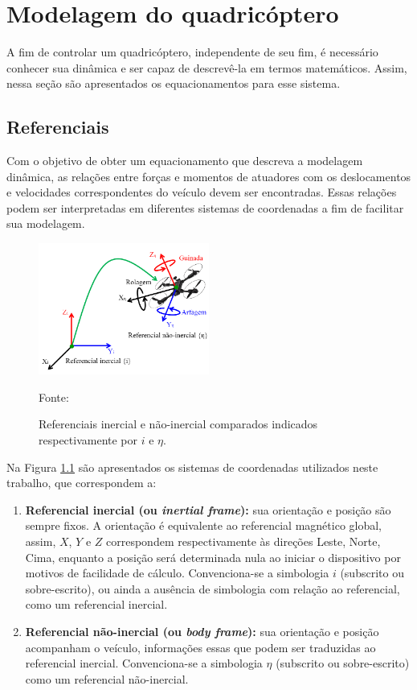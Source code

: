 \documentclass[main.tex]{subfiles}
\begin{document}
\chapter{Modelagem do quadricóptero}
\label{chap:modelagem}

A fim de controlar um quadricóptero, independente de seu fim, é necessário conhecer sua dinâmica e ser capaz de descrevê-la em termos matemáticos. Assim, nessa seção são apresentados os equacionamentos para esse sistema.

\section{Referenciais}

Com o objetivo de obter um equacionamento que descreva a modelagem dinâmica, as relações entre forças e momentos de atuadores com os deslocamentos e velocidades correspondentes do veículo devem ser encontradas. Essas relações podem ser interpretadas em diferentes sistemas de coordenadas a fim de facilitar sua modelagem. 

\begin{figure}[!h]
	\centering
	\caption{Referenciais inercial e não-inercial comparados indicados respectivamente por $i$ e $\eta$.}
	\includegraphics[width=0.5\textwidth]{capitulos/modelagem/imgs/referenciais.png}
	\label{fig:referenciais}
	\begin{flushleft}
		\small{Fonte: \cite{imagem_referenciais}}
	\end{flushleft}
\end{figure}

Na Figura \ref{fig:referenciais} são apresentados os sistemas de coordenadas utilizados neste trabalho, que correspondem a:

\begin{enumerate}
    \item \textbf{Referencial inercial (ou \textit{inertial frame}):} sua orientação e posição são sempre fixos. A orientação é equivalente ao referencial magnético global, assim, $X$, $Y$ e $Z$ correspondem respectivamente às direções Leste, Norte, Cima, enquanto a posição será determinada nula ao iniciar o dispositivo por motivos de facilidade de cálculo. Convenciona-se a simbologia $i$ (subscrito ou sobre-escrito), ou ainda a ausência de simbologia com relação ao referencial, como um referencial inercial.
    \item \textbf{Referencial não-inercial (ou \textit{body frame}):} sua orientação e posição acompanham o veículo, informações essas que podem ser traduzidas ao referencial inercial. Convenciona-se a simbologia $\eta$ (subscrito ou sobre-escrito) como um referencial não-inercial.
\end{enumerate}
\end{document}
